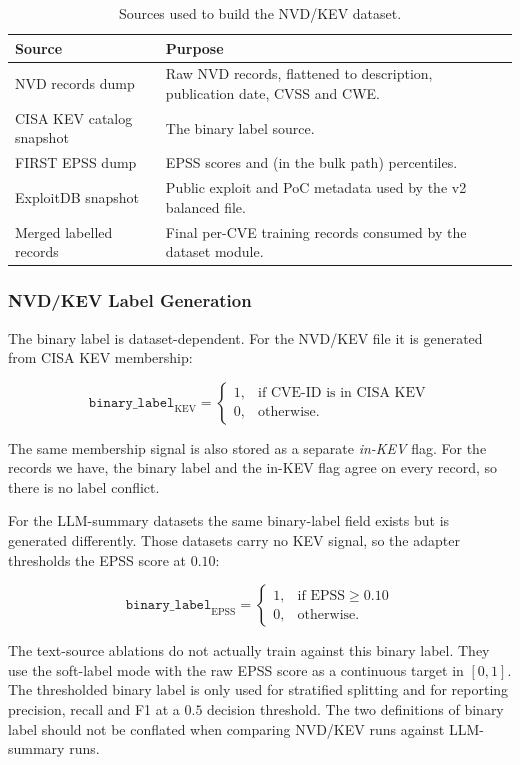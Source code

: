 \documentclass[11pt]{article}
\begin{document}
\begin{table}[h]
\centering
\small
\begin{tabular}{p{}p{}}
\toprule
Source & Purpose \\
\midrule
NVD records dump & Raw NVD records, flattened to description, publication date, CVSS and CWE. \\
CISA KEV catalog snapshot & The binary label source. \\
FIRST EPSS dump & EPSS scores and (in the bulk path) percentiles. \\
ExploitDB snapshot & Public exploit and PoC metadata used by the v2 balanced file. \\
Merged labelled records & Final per-CVE training records consumed by the dataset module. \\
\bottomrule
\end{tabular}
\caption{Sources used to build the NVD/KEV dataset.}
\end{table}

\subsubsection{NVD/KEV Label Generation}

The binary label is dataset-dependent. For the NVD/KEV file it is
generated from CISA KEV membership:

\[
\texttt{binary\_label}_{\text{KEV}} =
\begin{cases}
1, & \text{if CVE-ID is in CISA KEV} \\
0, & \text{otherwise.}
\end{cases}
\]

The same membership signal is also stored as a separate \emph{in-KEV}
flag. For the records we have, the binary label and the in-KEV flag
agree on every record, so there is no label conflict.

For the LLM-summary datasets the same binary-label field exists but
is generated differently. Those datasets carry no KEV signal, so the
adapter thresholds the EPSS score at $0.10$:

\[
\texttt{binary\_label}_{\text{EPSS}} =
\begin{cases}
1, & \text{if EPSS} \geq 0.10 \\
0, & \text{otherwise.}
\end{cases}
\]

The text-source ablations do not actually train against this binary
label. They use the soft-label mode with the raw EPSS score as a
continuous target in $[0, 1]$. The thresholded binary label is only
used for stratified splitting and for reporting precision, recall and
F1 at a $0.5$ decision threshold. The two definitions of binary label
should not be conflated when comparing NVD/KEV runs against
LLM-summary runs.
\end{document}
